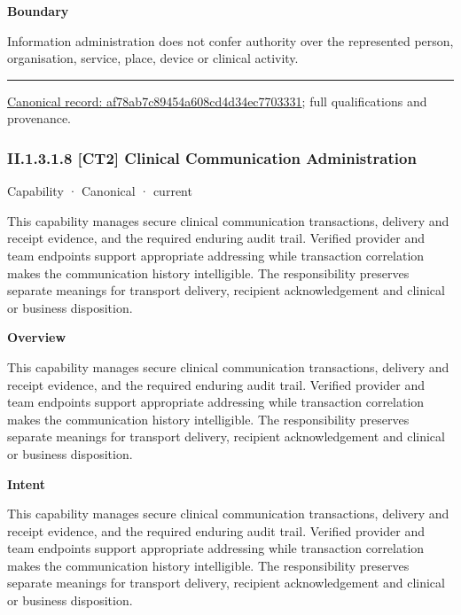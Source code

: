 \textbf{Boundary}



Information administration does not confer authority over the represented person, organisation, service, place, device or clinical activity.



\medskip\hrule\medskip

{\footnotesize \href{../../../../continuum/strategy/capability/af78ab7c89454a608cd4d34ec7703331.md}{Canonical record: af78ab7c89454a608cd4d34ec7703331}; full qualifications and provenance.}\par
\subsubsection*{II.1.3.1.8 [CT2] Clinical Communication Administration}
\label{navigation:II.1.3.1.8}

\label{element:b38f2c2811724734b5887b6dbaaabbfc}
{\small Capability · Canonical · current}\par

This capability manages secure clinical communication transactions, delivery and receipt evidence, and the required enduring audit trail. Verified provider and team endpoints support appropriate addressing while transaction correlation makes the communication history intelligible. The responsibility preserves separate meanings for transport delivery, recipient acknowledgement and clinical or business disposition.



\textbf{Overview}



This capability manages secure clinical communication transactions, delivery and receipt evidence, and the required enduring audit trail. Verified provider and team endpoints support appropriate addressing while transaction correlation makes the communication history intelligible. The responsibility preserves separate meanings for transport delivery, recipient acknowledgement and clinical or business disposition.



\textbf{Intent}



This capability manages secure clinical communication transactions, delivery and receipt evidence, and the required enduring audit trail. Verified provider and team endpoints support appropriate addressing while transaction correlation makes the communication history intelligible. The responsibility preserves separate meanings for transport delivery, recipient acknowledgement and clinical or business disposition.



